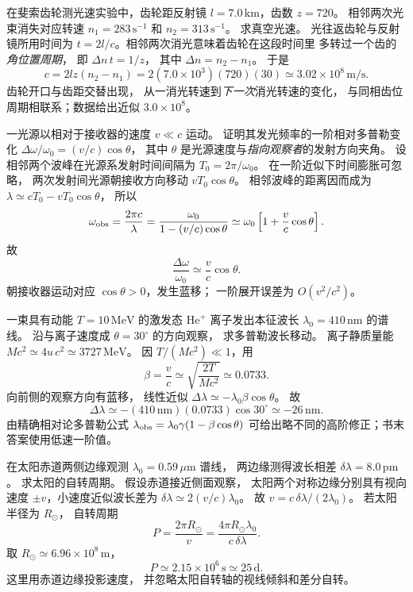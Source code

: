 
在斐索齿轮测光速实验中，齿轮距反射镜
$l=7.0\,\mathrm{km}$，齿数 $z=720$。
相邻两次光束消失对应转速
$n_1=283\,\mathrm{s^{-1}}$ 和
$n_2=313\,\mathrm{s^{-1}}$。
求真空光速。
\exsolution
光往返齿轮与反射镜所用时间为
$t=2l/c$。相邻两次消光意味着齿轮在这段时间里
多转过一个齿的\emph{角位置周期}，
即 $\Delta n\,t=1/z$，
其中 $\Delta n=n_2-n_1$。
于是
\[
 \boxed{c=2lz(n_2-n_1)
 =2(7.0\times10^3)(720)(30)
 \simeq3.02\times10^8\,\mathrm{m/s}}.
\]
\excheck 齿轮开口与齿距交替出现，
从一消光转速到\emph{下一次}消光转速的变化，
与同相齿位周期相联系；数据给出近似 $3.0\times10^8$。

一光源以相对于接收器的速度 $v\ll c$ 运动。
证明其发光频率的一阶相对多普勒变化
$\Delta\omega/\omega_0=(v/c)\cos\theta$，
其中 $\theta$ 是光源速度与\emph{指向观察者}的发射方向夹角。
\exsolution
设相邻两个波峰在光源系发射时间间隔为
$T_0=2\pi/\omega_0$。
在一阶近似下时间膨胀可忽略，
两次发射间光源朝接收方向移动
$vT_0\cos\theta$。
相邻波峰的距离因而成为
$\lambda\simeq cT_0-vT_0\cos\theta$，
所以
\[
 \omega_{\rm obs}=\frac{2\pi c}{\lambda}
 =\frac{\omega_0}{1-(v/c)\cos\theta}
 \simeq\omega_0\left[1+\frac vc\cos\theta\right].
\]
故
\[
 \boxed{\frac{\Delta\omega}{\omega_0}
 \simeq\frac vc\cos\theta}.
\]
\excheck 朝接收器运动对应 $\cos\theta>0$，发生蓝移；
一阶展开误差为 $O(v^2/c^2)$。

一束具有动能 $T=10\,\mathrm{MeV}$ 的激发态
$\mathrm{He}^+$ 离子发出本征波长
$\lambda_0=410\,\mathrm{nm}$ 的谱线。
沿与离子速度成 $\theta=30^\circ$ 的方向观察，
求多普勒波长移动。
\exsolution
离子静质量能
$Mc^2\simeq4u\,c^2\simeq3727\,\mathrm{MeV}$。
因 $T/(Mc^2)\ll1$，用
\[
 \beta=\frac vc\simeq\sqrt{\frac{2T}{Mc^2}}
 \simeq0.0733.
\]
向前侧的观察方向有蓝移，
线性近似
$\Delta\lambda\simeq-\lambda_0\beta\cos\theta$。
故
\[
 \boxed{\Delta\lambda\simeq
 -(410\,\mathrm{nm})(0.0733)\cos30^\circ
 \simeq-26\,\mathrm{nm}}.
\]
\excheck 由精确相对论多普勒公式
$\lambda_{\rm obs}=\lambda_0\gamma(1-\beta\cos\theta)$
可给出略不同的高阶修正；书末答案使用低速一阶值。

在太阳赤道两侧边缘观测
$\lambda_0=0.59\,\mu\mathrm m$ 谱线，
两边缘测得波长相差
$\delta\lambda=8.0\,\mathrm{pm}$。
求太阳的自转周期。
\exsolution
假设赤道接近侧面观察，
太阳两个对称边缘分别具有视向速度
$\pm v$，小速度近似波长差为
$\delta\lambda\simeq2(v/c)\lambda_0$。
故 $v=c\,\delta\lambda/(2\lambda_0)$。
若太阳半径为 $R_\odot$，
自转周期
\[
 P=\frac{2\pi R_\odot}{v}
 =\boxed{\frac{4\pi R_\odot\lambda_0}
 {c\,\delta\lambda}}.
\]
取 $R_\odot\simeq6.96\times10^8\,\mathrm m$，
\[
 \boxed{P\simeq2.15\times10^6\,\mathrm s
 \simeq25\,\mathrm d}.
\]
\excheck 这里用赤道边缘投影速度，
并忽略太阳自转轴的视线倾斜和差分自转。

